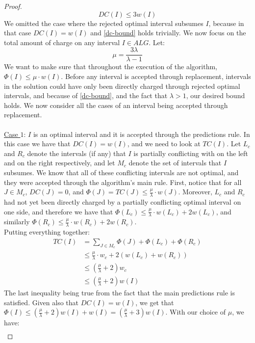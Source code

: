 \begin{proof}
\begin{equation}
\label{dc-bound}
    DC(I) \leq 3w(I)
\end{equation}
We omitted the case where the rejected optimal interval subsumes $I$, because in that case $DC(I) = w(I)$ and \ref{dc-bound} holds trivially. We now focus on the total amount of charge on any interval $I\in ALG$. Let:
$$\mu = \frac{3\lambda}{\lambda - 1}$$
We want to make sure that throughout the execution of the algorithm, $\Phi(I) \leq \mu \cdot w(I)$. Before any interval is accepted through replacement, intervals in the solution could have only been directly charged through rejected optimal intervals, and because of \eqref{dc-bound}, and the fact that $\lambda > 1$, our desired bound holds. We now consider all the cases of an interval being accepted through replacement.\\\\
\underline{Case $1$}: $I$ is an optimal interval and it is accepted through the predictions rule. In this case we have that $DC(I) = w(I)$, and we need to look at $TC(I)$. Let $L_c$ and $R_c$ denote the intervals (if any) that $I$ is partially conflicting with on the left and on the right respectively, and let $M_c$ denote the set of intervals that $I$ subsumes. We know that all of these conflicting intervals are not optimal, and they were accepted through the algorithm's main rule. First, notice that for all $J\in M_c$, $DC(J) = 0$, and $\Phi(J) = TC(J) \leq \frac{\mu}{\lambda} \cdot w(J)$. Moreover, $L_c$ and $R_c$ had not yet been directly charged by a partially conflicting optimal interval on one side, and therefore we have that $\Phi(L_c) \leq \frac{\mu}{\lambda}\cdot w(L_c) + 2w(L_c)$, and similarly $\Phi(R_c) \leq \frac{\mu}{\lambda}\cdot w(R_c) + 2w(R_c)$.\\
Putting everything together:
\[
\begin{aligned}
    TC(I) &= \sum_{J\in M_c} \Phi(J) + \Phi(L_c) + \Phi(R_c) \\
     & \leq \frac{\mu}{\lambda}\cdot w_c + 2(w(L_c) + w(R_c))\\
     & \leq \left(\frac{\mu}{\lambda} + 2\right)w_c\\
     &\leq \left(\frac{\mu}{\lambda} + 2\right)w(I)
\end{aligned}
\]
The last inequality being true from the fact that the main predictions rule is satisfied. Given also that $DC(I) = w(I)$, we get that $\Phi(I) \leq (\frac{\mu}{\lambda} + 2)w(I) + w(I) = (\frac{\mu}{\lambda} + 3)w(I)$. With our choice of $\mu$, we have:
\[\begin{aligned}

\end{aligned}\]
\end{proof}
